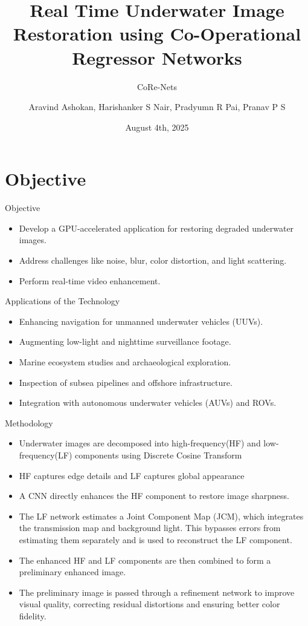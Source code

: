 \documentclass[aspectratio=169,xcolor=dvipsnames]{beamer}
\title{Real Time Underwater Image Restoration
using Co-Operational Regressor Networks}
\subtitle{CoRe-Nets}
\author{Aravind Ashokan, Harishanker S Nair, Pradyumn R Pai, Pranav P S}
\institute
{
    Department of Computer Science and Engineering \\
    Govt. Model Engineering College
}
\date{August 4th, 2025} %
\begin{document}
\begin{frame}
    \titlepage
\end{frame}


\section{Objective}
\begin{frame}{Objective}
\begin{itemize}
    \item Develop a GPU-accelerated application for restoring degraded underwater images.
    \item Address challenges like noise, blur, color distortion, and light scattering.
    \item Perform real-time video enhancement.
\end{itemize}
\end{frame}

\begin{frame}{Applications of the Technology}
\begin{itemize}
    \item Enhancing navigation for unmanned underwater vehicles (UUVs).
    \item Augmenting low-light and nighttime surveillance footage.
    \item Marine ecosystem studies and archaeological exploration.
    \item Inspection of subsea pipelines and offshore infrastructure.
    \item Integration with autonomous underwater vehicles (AUVs) and ROVs.
\end{itemize}
\end{frame}

\begin{frame}{Methodology}
\begin{itemize}
    \item Underwater images are decomposed into high-frequency(HF) and low-frequency(LF) components using Discrete Cosine Transform
    \item HF captures edge details and LF captures global appearance
    \item A CNN directly enhances the HF component to restore image sharpness.
    \item The LF network estimates a Joint Component Map (JCM), which integrates the transmission map and background light. This bypasses errors from estimating them separately and is used to reconstruct the LF component.
    \item The enhanced HF and LF components are then combined to form a preliminary enhanced image.
    \item The preliminary image is passed through a refinement network to improve visual quality, correcting residual distortions and ensuring better color fidelity.
\end{itemize}
\end{frame}
\end{document}

